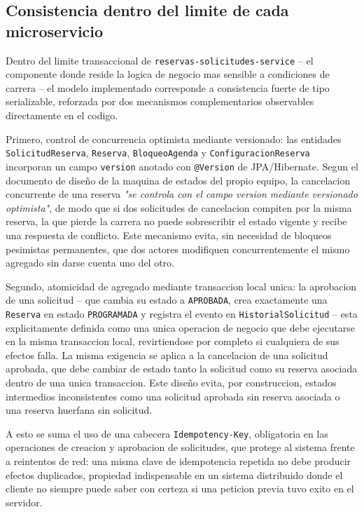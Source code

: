 \documentclass[11pt,a4paper]{article}
\begin{document}
\subsection{Consistencia dentro del limite de cada microservicio}

Dentro del limite transaccional de \texttt{reservas-solicitudes-service} -- el componente donde reside la logica de negocio mas sensible a condiciones de carrera -- el modelo implementado corresponde a consistencia fuerte de tipo serializable, reforzada por dos mecanismos complementarios observables directamente en el codigo.

Primero, control de concurrencia optimista mediante versionado: las entidades \texttt{SolicitudReserva}, \texttt{Reserva}, \texttt{BloqueoAgenda} y \texttt{ConfiguracionReserva} incorporan un campo \texttt{version} anotado con \texttt{@Version} de JPA/Hibernate. Segun el documento de diseño de la maquina de estados del propio equipo, la cancelacion concurrente de una reserva \emph{"se controla con el campo version mediante versionado optimista"}, de modo que si dos solicitudes de cancelacion compiten por la misma reserva, la que pierde la carrera no puede sobrescribir el estado vigente y recibe una respuesta de conflicto. Este mecanismo evita, sin necesidad de bloqueos pesimistas permanentes, que dos actores modifiquen concurrentemente el mismo agregado sin darse cuenta uno del otro.

Segundo, atomicidad de agregado mediante transaccion local unica: la aprobacion de una solicitud -- que cambia su estado a \texttt{APROBADA}, crea exactamente una \texttt{Reserva} en estado \texttt{PROGRAMADA} y registra el evento en \texttt{HistorialSolicitud} -- esta explicitamente definida como una unica operacion de negocio que debe ejecutarse en la misma transaccion local, revirtiendose por completo si cualquiera de sus efectos falla. La misma exigencia se aplica a la cancelacion de una solicitud aprobada, que debe cambiar de estado tanto la solicitud como su reserva asociada dentro de una unica transaccion. Este diseño evita, por construccion, estados intermedios inconsistentes como una solicitud aprobada sin reserva asociada o una reserva huerfana sin solicitud.

A esto se suma el uso de una cabecera \texttt{Idempotency-Key}, obligatoria en las operaciones de creacion y aprobacion de solicitudes, que protege al sistema frente a reintentos de red: una misma clave de idempotencia repetida no debe producir efectos duplicados, propiedad indispensable en un sistema distribuido donde el cliente no siempre puede saber con certeza si una peticion previa tuvo exito en el servidor.
\end{document}

